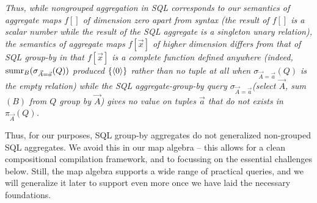 \begin{remark}\em
Thus, while nongrouped aggregation in SQL corresponds to our semantics of aggregate
maps $f[]$ of dimension zero apart from syntax (the result of $f[]$ is a scalar number
while the result of the SQL aggregate is a singleton unary relation),
the semantics of aggregate maps $f[\vec{x}]$ of higher dimension differs from that
of SQL group-by in that $f[\vec{x}]$ is a complete function defined anywhere
(indeed, $\mbox{sumr}_B(\sigma_{\vec{A}=\vec{a}}(Q))$ produced $\{{\langle0\rangle}\}$ rather
than no tuple at all when $\sigma_{\vec{A}=\vec{a}}(Q)$ is the empty relation) while
the SQL aggregate-group-by query
$\sigma_{\vec{A}=\vec{a}}$(select $\vec{A}$, sum$(B)$ from $Q$ group by $\vec{A}$)
gives no value on tuples $\vec{a}$ that do not exists in $\pi_{\vec{A}}(Q)$.

Thus, for our purposes, SQL group-by aggregates do not generalized non-grouped
SQL aggregates. We avoid this in our map algebra -- this allows for a clean
compositional compilation framework, and to focussing on the essential challenges
below. Still, the map algebra supports a wide range of practical queries, and we will
generalize it later to support even more once we have laid the necessary foundations.
\end{remark}


